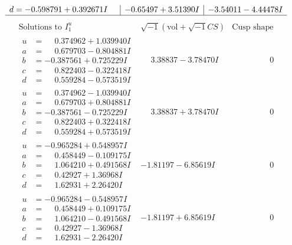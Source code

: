 \documentclass[1p]{elsarticle_modified}
\theoremstyle{definition}
\newcommand{\I}{\sqrt{-1}}
\begin{document}
$$\begin{array}{c|c|c}
\begin{aligned}
d &= -0.598791 + 0.392671 I\end{aligned}
 & -0.65497 + 3.51390 I & -3.54011 - 4.44478 I\\
 \hline 
 \end{array}$$\newpage$$\begin{array}{c|c|c}  
\text{Solutions to }I^u_{1}& \I (\text{vol} + \sqrt{-1}CS) & \text{Cusp shape}\\
 \hline 
\begin{aligned}
u &= \phantom{-}0.374962 + 1.039940 I \\
a &= \phantom{-}0.679703 - 0.804881 I \\
b &= -0.387561 + 0.725229 I \\
c &= \phantom{-}0.822403 - 0.322418 I \\
d &= \phantom{-}0.559284 - 0.573519 I\end{aligned}
 & \phantom{-}3.38837 - 3.78470 I & \phantom{-0.000000 } 0 \\ \hline\begin{aligned}
u &= \phantom{-}0.374962 - 1.039940 I \\
a &= \phantom{-}0.679703 + 0.804881 I \\
b &= -0.387561 - 0.725229 I \\
c &= \phantom{-}0.822403 + 0.322418 I \\
d &= \phantom{-}0.559284 + 0.573519 I\end{aligned}
 & \phantom{-}3.38837 + 3.78470 I & \phantom{-0.000000 } 0 \\ \hline\begin{aligned}
u &= -0.965284 + 0.548957 I \\
a &= \phantom{-}0.458449 - 0.109175 I \\
b &= \phantom{-}1.064210 + 0.491568 I \\
c &= \phantom{-}0.42927 + 1.36968 I \\
d &= \phantom{-}1.62931 + 2.26420 I\end{aligned}
 & -1.81197 - 6.85619 I & \phantom{-0.000000 } 0 \\ \hline\begin{aligned}
u &= -0.965284 - 0.548957 I \\
a &= \phantom{-}0.458449 + 0.109175 I \\
b &= \phantom{-}1.064210 - 0.491568 I \\
c &= \phantom{-}0.42927 - 1.36968 I \\
d &= \phantom{-}1.62931 - 2.26420 I\end{aligned}
 & -1.81197 + 6.85619 I & \phantom{-0.000000 } 0 \\ \hline\begin{aligned}

\end{aligned}
\end{array}$$
\end{document}
